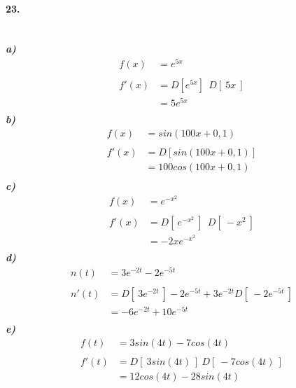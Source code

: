 \documentclass[12pt, a4paper]{article}
\begin{document}
        \paragraph{23.}
        \textit{
            \\
            \textbf{a)}
        }
        \begin{equation*}
            \begin{split}
                f(x)&= e^{5x}\\\\
                f'(x)&= D[e^{5x}]~~D[~5x~]\\
                &=5e^{5x}\\
            \end{split}
        \end{equation*}
        \textit{
            \textbf{b)}
        }
        \begin{equation*}
            \begin{split}
                f(x)&= sin(100x+0,1)\\\\
                f'(x)&= D[sin(100x+0,1)]\\
                &= 100cos(100x+0,1)\\
            \end{split}
        \end{equation*}
        \textit{
            \textbf{c)}
        }
        \begin{equation*}
            \begin{split}
                f(x)&=e^{-x^2}\\\\
                f'(x)&=D[~e^{-x^2}~]~~D[~-x^2~]\\
                &=-2xe^{-x^2}\\
            \end{split}
        \end{equation*}
        \textit{
            \textbf{d)}
        }
        \begin{equation*}
            \begin{split}
                n(t)&= 3e^{-2t}-2e^{-5t}\\\\
                n'(t)&= D[~3e^{-2t}~] -2e^{-5t}+3e^{-2t}D[~-2e^{-5t}~]\\
                &=-6e^{-2t}+ 10e^{-5t}\\
            \end{split}
        \end{equation*}
        \textit{
            \textbf{e)}
        }
        \begin{equation*}
            \begin{split}
                f(t)&=3sin(4t)-7cos(4t)\\\\
                f'(t)&=D[~3sin(4t)~]~D[~-7cos(4t)~]\\
                &=12cos(4t)-28sin(4t)\\
            \end{split}
        \end{equation*}
        \newpage
\end{document}
